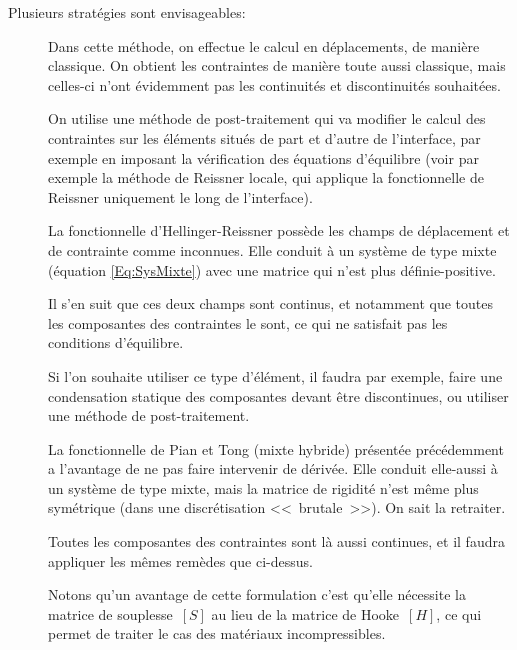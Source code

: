\bigskip
Plusieurs stratégies sont envisageables:
\begin{description}
\item[]

	Dans cette méthode, on effectue le calcul en déplacements, de manière classique.
	On obtient les contraintes de manière toute aussi classique, mais celles-ci
	n'ont évidemment pas les continuités et discontinuités souhaitées.

	On utilise une méthode de post-traitement qui va modifier le calcul des contraintes
	sur les éléments situés de part et d'autre de l'interface, par exemple
	en imposant la vérification des équations d'équilibre (voir par exemple
	la méthode de Reissner locale, qui applique la fonctionnelle de Reissner uniquement
	le long de l'interface).
\item[]

	La fonctionnelle d'Hellinger-Reissner
	possède les champs de déplacement et de
	contrainte comme inconnues. Elle conduit à un système de type mixte
	(équation \eqref{Eq:SysMixte}) avec une matrice qui n'est plus définie-positive.

	Il s'en suit que ces deux champs sont continus, et notamment que toutes les
	composantes des contraintes le sont, ce qui ne satisfait pas les conditions
	d'équilibre.

	Si l'on souhaite utiliser ce type d'élément, il faudra par exemple, faire une
	condensation statique des composantes devant être discontinues, ou
	utiliser une méthode de post-traitement.
\item[]

	La fonctionnelle de Pian et Tong (mixte hybride)
	présentée précédemment
	a l'avantage de ne pas faire intervenir de dérivée. Elle conduit elle-aussi
	à un système de type mixte, mais la matrice de rigidité n'est même
	plus symétrique (dans une discrétisation <<~brutale~>>). On sait la retraiter.

	Toutes les composantes des contraintes sont là aussi continues, et il faudra appliquer les
	mêmes remèdes que ci-dessus.

	Notons qu'un avantage de cette formulation c'est qu'elle nécessite la matrice
	de souplesse~$[S]$ au lieu de la matrice de Hooke~$[H]$, ce qui permet de
	traiter le cas des matériaux incompressibles.
\item[]
	

\end{description}
